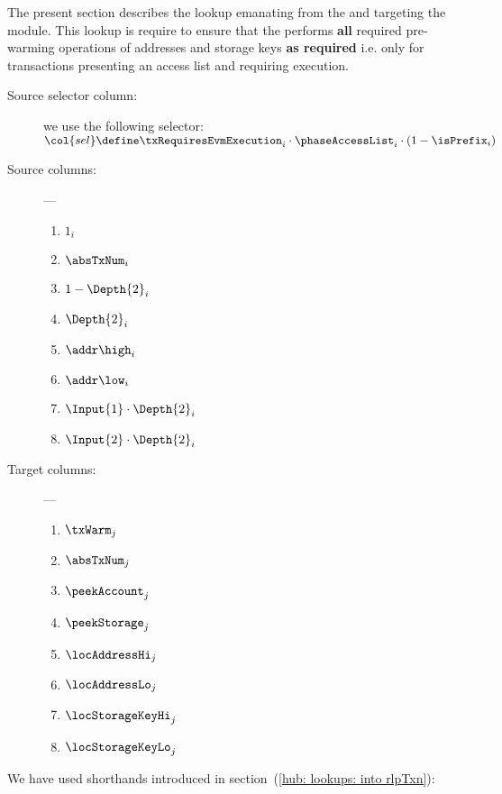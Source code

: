 The present section describes the lookup emanating from the \rlpTxnMod{} and targeting the \hubMod{} module. 
This lookup is require to ensure that the \hubMod{} performs \textbf{all} required pre-warming operations of addresses and storage keys \textbf{as required} i.e. only for transactions presenting an access list and requiring \evm{} execution.
\begin{description}
	\item[Source selector column:]
		we use the following selector:
		$\col{sel}
		\define
		\txRequiresEvmExecution _{i}
		\cdot \phaseAccessList _{i}
		\cdot (1 - \isPrefix_{i})$
	\item[Source columns:] ---
		\begin{multicols}{2}
			\begin{enumerate}
				\item $1                          _{i}$
				\item $\absTxNum                  _{i}$
				\item $1 - \Depth{2}              _{i}$
				\item $\Depth{2}                  _{i}$
				\item $\addr\high                 _{i}$
				\item $\addr\low                  _{i}$
				\item $\Input{1} \cdot \Depth{2}  _{i}$
				\item $\Input{2} \cdot \Depth{2}  _{i}$
			\end{enumerate}
		\end{multicols}
	\item[Target columns:] ---
		\begin{multicols}{2}
			\begin{enumerate}
				\item $\txWarm           _{j}$
				\item $\absTxNum         _{j}$
				\item $\peekAccount      _{j}$
				\item $\peekStorage      _{j}$
				\item $\locAddressHi     _{j}$
				\item $\locAddressLo     _{j}$
				\item $\locStorageKeyHi  _{j}$
				\item $\locStorageKeyLo  _{j}$
			\end{enumerate}
		\end{multicols}
\end{description}
\saNote{}
We have used shorthands introduced in section~(\ref{hub: lookups: into rlpTxn}):

